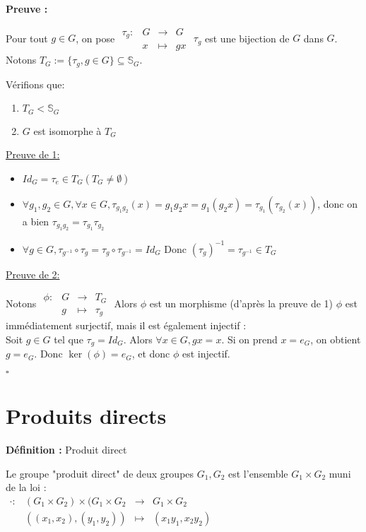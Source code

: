 \documentclass{report}
\renewenvironment{leftbar}{%
  \def\FrameCommand{\vrule width 0.4pt \hspace{10pt}}%
  \MakeFramed {\advance\hsize-\width \FrameRestore}}%
 {\endMakeFramed}%
\newenvironment{definition}[1][]{
    \begin{tcolorbox}[colframe= white]
    \textbf{Définition :} 
    #1 \par
    }
    {\end{tcolorbox}}
\newenvironment{preuve}{\vspace*{0.5cm}
    \begin{leftbar}
    \noindent\textbf{Preuve :}\par}{
    \begin{flushright}
    $\square$
    \end{flushright}
    \end{leftbar}
}
\newcommand{\fonction}[5]{
    \begin{array}{l|rcl}
    #1: & #2 & \longrightarrow & #3 \\
        & #4 & \longmapsto & #5 
    \end{array}
}
\begin{document}
\begin{preuve}
    Pour tout $g\in G$, on pose $\fonction{\tau_g}{G}{G}{x}{gx}$ $\tau_g$ est une bijection de $G$ dans $G$. Notons $T_G := \{\tau_g,g\in G\} \subseteq \mathbb{S}_G$. \par
    \noindent Vérifions que:  \par
    
    \begin{enumerate}
    \item $T_G < \mathbb{S}_G$
    \item $G$ est isomorphe à $T_G$
    \end{enumerate}

\noindent\underline{Preuve de 1:}
\begin{itemize}[label = $\bullet$]
\item $Id_G = \tau_e \in T_G (T_G \neq \emptyset)$
\item  $\forall g_1,g_2 \in G,\forall x \in G, \tau_{g_1 g_2}(x) = g_1 g_2 x = g_1(g_2 x) = \tau_{g_1}(\tau_{g_2}(x))$, donc on a bien $\tau_{g_1 g_2} = \tau_{g_1} \tau_{g_2}$
\item $\forall g \in G, \tau_{g^{-1}} \circ \tau_g = \tau_g \circ \tau_{g^{-1}} = Id_G$ Donc $(\tau_g)^{-1} = \tau_{g^{-1}} \in T_G$
\end{itemize}

\noindent\underline{Preuve de 2:}

    Notons $\fonction{\phi}{G}{T_G}{g}{\tau_g}$
    Alors $\phi$ est un morphisme (d'après la preuve de 1) $\phi$ est immédiatement surjectif, mais il est également injectif :\\
Soit $g\in G$ tel que $\tau_g = Id_G$. Alors $\forall x \in G, gx =  x$. Si on prend $x =  e_G$, on obtient $g = e_G$. Donc $\ker(\phi) = {e_G}$, et donc $\phi$ est injectif.
\end{preuve}

\section{Produits directs}

\begin{definition}[Produit direct]
    Le groupe "produit direct" de deux groupes $G_1, G_2$ est l'ensemble $G_1 \times G_2$ muni de la loi :\\
    $\fonction{\cdot}{(G_1 \times G_2)\times(G_1 \times G_2}{G_1 \times G_2}{((x_1 ,x_2),(y_1 ,y_2))}{(x_1 y_1 ,x_2 y_2)}$
\end{definition}
\end{document}
